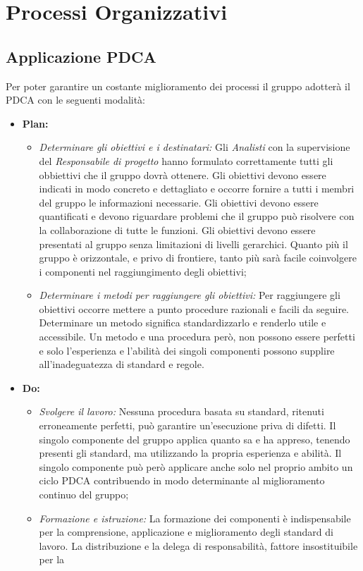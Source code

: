 \section{Processi Organizzativi}
\subsection{Applicazione PDCA}
Per poter garantire un costante miglioramento dei processi il gruppo \gruppo adotterà il PDCA con le seguenti modalità:
\begin{itemize}
\item \textbf{Plan:}
  \begin{itemize}
  \item \emph{Determinare gli obiettivi e i destinatari:} Gli \emph{Analisti} con la supervisione del \emph{Responsabile di progetto} hanno formulato correttamente tutti gli obbiettivi che il gruppo dovrà ottenere. Gli obiettivi devono essere indicati in modo concreto e dettagliato e occorre fornire a tutti i membri del gruppo le informazioni necessarie. Gli obiettivi devono essere quantificati e devono riguardare  problemi che il gruppo può risolvere con la collaborazione di tutte le funzioni.
  Gli obiettivi devono essere presentati al gruppo senza limitazioni di livelli gerarchici. Quanto più il gruppo è orizzontale, e privo di frontiere, tanto più sarà facile coinvolgere i componenti nel raggiungimento degli obiettivi;
  \item \emph{Determinare i metodi per raggiungere gli obiettivi:} Per raggiungere gli obiettivi occorre mettere a punto procedure razionali e facili da seguire. Determinare un metodo significa standardizzarlo e renderlo utile e accessibile.
  Un metodo e una procedura però, non possono essere perfetti e solo l’esperienza e l’abilità dei singoli componenti possono supplire all’inadeguatezza di standard e regole. 
  \end{itemize}
 \item \textbf{Do:}
 \begin{itemize}
  \item \emph{Svolgere il lavoro:} Nessuna procedura basata su standard, ritenuti erroneamente perfetti, può garantire un’esecuzione priva di difetti. Il singolo componente del gruppo applica quanto sa e ha appreso, tenendo presenti gli standard, ma utilizzando la propria  esperienza e abilità. Il singolo componente può però applicare anche solo nel  proprio ambito un ciclo PDCA contribuendo in modo determinante al miglioramento continuo del gruppo;
  \item \emph{Formazione e istruzione:} La formazione dei componenti è indispensabile per la comprensione, applicazione e miglioramento degli standard di lavoro. La distribuzione e la delega di responsabilità, fattore insostituibile per la

\end{itemize}
\end{itemize}
